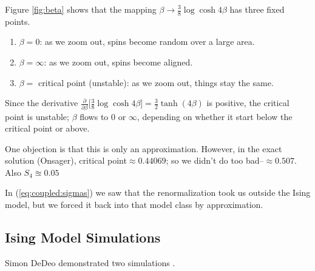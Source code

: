 \documentclass[]{article}
\begin{document}
Figure \ref{fig:beta} shows that the mapping $\beta\rightarrow\frac{3}{8} \log{\cosh{4\beta} }$ has three fixed points.
\begin{enumerate}
	\item $\beta=0$: as we zoom out, spins become random over a large area.
	\item  $\beta=\infty$: as we zoom out, spins become aligned.
	\item  $\beta=$ critical point (unstable): as we zoom out, things stay the same.
\end{enumerate}

Since the derivative  $\frac{\partial}{\partial \beta}\big[\frac{3}{8} \log{\cosh{4\beta}}\big]=\frac{3}{2} \tanh(4\beta)$ is positive, the critical point is unstable; $\beta$ flows to $0$ or $\infty$, depending on whether it start below the critical point or above.

One objection is that this is only an approximation. However, in the exact solution (Onsager), critical point$\approx0.44069$; so we didn't do too bad--$\approx0.507$. Also $S_4\approxeq0.05$

In (\ref{eq:coupled:sigmas}) we saw that the renormalization took us outside the Ising model, but we forced it back into that model class by approximation.

\subsection{Ising Model Simulations}

Simon DeDeo demonstrated two simulations \cite{nottelmann2000ising,ashton2012renormalization}.
\end{document}
